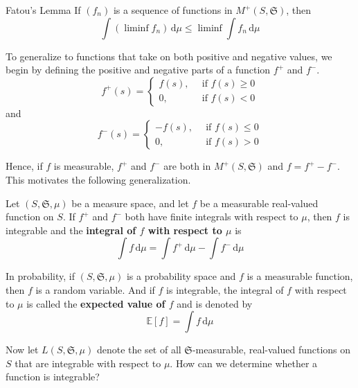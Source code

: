 \begin{lemma}[]{Fatou's Lemma}{}
	If $(f_n)$ is a sequence of functions in $M^+(S, \mathfrak{S})$, then
	\[
		\int (\liminf f_n)\, \mathrm{d}\mu \leq \liminf \int f_n\, \mathrm{d}\mu
	\]
\end{lemma}

To generalize to functions that take on both positive and negative values, we begin by defining the positive and negative parts of a function $f^+$ and $f^-$.
\begin{equation*}
	f^+(s) = 
    \begin{cases}
      f(s), \, &\text{ if } f(s) \geq 0 \\
	  0, \, &\text{ if } f(s) < 0
    \end{cases}
\end{equation*}
and
\begin{equation*}
	f^-(s) = 
    \begin{cases}
      -f(s), \, &\text{ if } f(s) \leq 0 \\
	  0, \, &\text{ if } f(s) > 0
    \end{cases}
\end{equation*}

Hence, if $f$ is measurable, $f^+$ and $f^-$ are both in $M^+(S, \mathfrak{S})$ and $f = f^+ - f^-$. This motivates the following generalization.

\begin{definition}[]{}{}
	Let $(S, \mathfrak{S}, \mu)$ be a measure space, and let $f$ be a measurable real-valued function on $S$. If $f^+$ and $f^-$ both have finite integrals with respect to $\mu$, then $f$ is integrable and the \textbf{integral of $f$ with respect to $\mu$} is 
	\[
		\int f \, \mathrm{d}\mu = \int f^+ \, \mathrm{d}\mu - \int f^- \, \mathrm{d}\mu
	\]
\end{definition}

In probability, if $(S, \mathfrak{S}, \mu)$ is a probability space and $f$ is a measurable function, then $f$ is a random variable. And if $f$ is integrable, the integral of $f$ with respect to $\mu$ is called the \textbf{expected value of $f$} and is denoted by
\[
	\mathbb{E}[f] = \int f \, \mathrm{d}\mu
\]

Now let $L(S, \mathfrak{S}, \mu)$ denote the set of all $\mathfrak{S}$-measurable, real-valued functions on $S$ that are integrable with respect to $\mu$. How can we determine whether a function is integrable?

